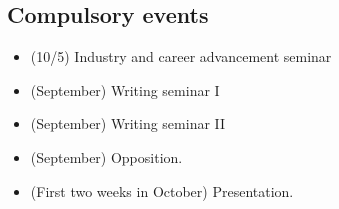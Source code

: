 \documentclass[parskip=half]{scrartcl}
\begin{document}
\subsection{Compulsory events}
\begin{itemize}
  \item (10/5) Industry and career advancement seminar
  \item (September) Writing seminar I
  \item (September) Writing seminar II
  \item (September) Opposition.
  \item (First two weeks in October) Presentation.
\end{itemize}









% 

\printbibliography{}
\end{document}
